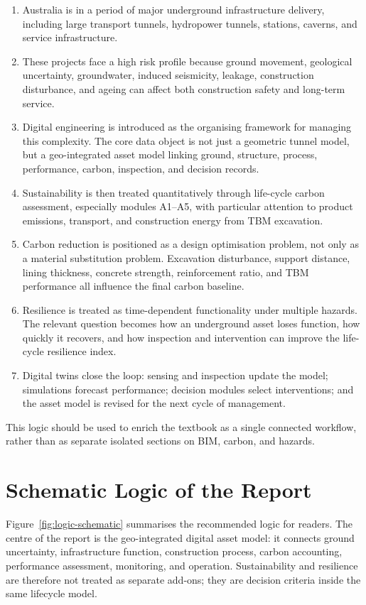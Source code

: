 \documentclass[11pt]{article}
\begin{document}
\begin{enumerate}
  \item Australia is in a period of major underground infrastructure delivery,
  including large transport tunnels, hydropower tunnels, stations, caverns, and
  service infrastructure.
  \item These projects face a high risk profile because ground movement,
  geological uncertainty, groundwater, induced seismicity, leakage, construction
  disturbance, and ageing can affect both construction safety and long-term
  service.
  \item Digital engineering is introduced as the organising framework for
  managing this complexity. The core data object is not just a geometric tunnel
  model, but a geo-integrated asset model linking ground, structure, process,
  performance, carbon, inspection, and decision records.
  \item Sustainability is then treated quantitatively through life-cycle carbon
  assessment, especially modules A1--A5, with particular attention to
  product emissions, transport, and construction energy from TBM excavation.
  \item Carbon reduction is positioned as a design optimisation problem, not
  only as a material substitution problem. Excavation disturbance, support
  distance, lining thickness, concrete strength, reinforcement ratio, and TBM
  performance all influence the final carbon baseline.
  \item Resilience is treated as time-dependent functionality under multiple
  hazards. The relevant question becomes how an underground asset loses
  function, how quickly it recovers, and how inspection and intervention can
  improve the life-cycle resilience index.
  \item Digital twins close the loop: sensing and inspection update the model;
  simulations forecast performance; decision modules select interventions; and
  the asset model is revised for the next cycle of management.
\end{enumerate}

This logic should be used to enrich the textbook as a single connected
workflow, rather than as separate isolated sections on BIM, carbon, and hazards.

\section{Schematic Logic of the Report}

Figure~\ref{fig:logic-schematic} summarises the recommended logic for readers.
The centre of the report is the geo-integrated digital asset model: it connects
ground uncertainty, infrastructure function, construction process, carbon
accounting, performance assessment, monitoring, and operation. Sustainability
and resilience are therefore not treated as separate add-ons; they are decision
criteria inside the same lifecycle model.
\end{document}
